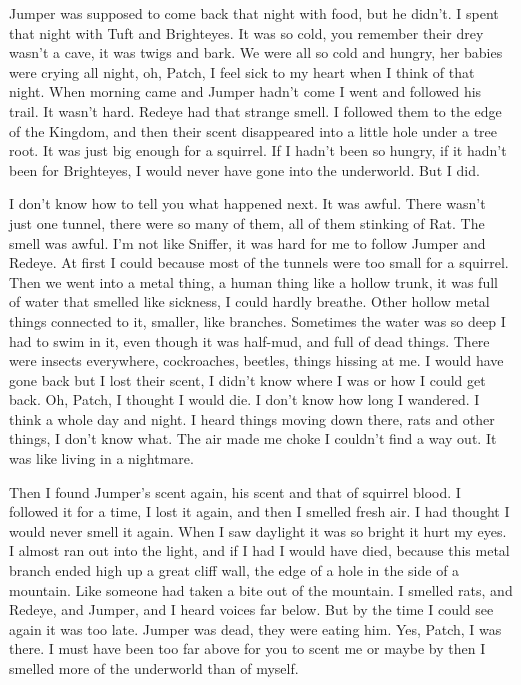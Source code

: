 \documentclass[11pt]{article}
\begin{document}
 Jumper was supposed to come back that night with food, but he didn't. I spent that night with Tuft and Brighteyes. It was so cold, you remember their drey wasn't a cave, it was twigs and bark. We were all so cold and hungry, her babies were crying all night, oh, Patch, I feel sick to my heart when I think of that night. When morning came and Jumper hadn't come I went and followed his trail. It wasn't hard. Redeye had that strange smell. I followed them to the edge of the Kingdom, and then their scent disappeared into a little hole under a tree root. It was just big enough for a squirrel. If I hadn't been so hungry, if it hadn't been for Brighteyes, I would never have gone into the underworld. But I did.\par
 I don't know how to tell you what happened next. It was awful. There wasn't just one tunnel, there were so many of them, all of them stinking of Rat. The smell was awful. I'm not like Sniffer, it was hard for me to follow Jumper and Redeye. At first I could because most of the tunnels were too small for a squirrel. Then we went into a metal thing, a human thing like a hollow trunk, it was full of water that smelled like sickness, I could hardly breathe. Other hollow metal things connected to it, smaller, like branches. Sometimes the water was so deep I had to swim in it, even though it was half-mud, and full of dead things. There were insects everywhere, cockroaches, beetles, things hissing at me. I would have gone back but I lost their scent, I didn't know where I was or how I could get back. Oh, Patch, I thought I would die. I don't know how long I wandered. I think a whole day and night. I heard things moving down there, rats and other things, I don't know what. The air made me choke I couldn't find a way out. It was like living in a nightmare.\par
 Then I found Jumper's scent again, his scent and that of squirrel blood. I followed it for a time, I lost it again, and then I smelled fresh air. I had thought I would never smell it again. When I saw daylight it was so bright it hurt my eyes. I almost ran out into the light, and if I had I would have died, because this metal branch ended high up a great cliff wall, the edge of a hole in the side of a mountain. Like someone had taken a bite out of the mountain. I smelled rats, and Redeye, and Jumper, and I heard voices far below. But by the time I could see again it was too late. Jumper was dead, they were eating him. Yes, Patch, I was there. I must have been too far above for you to scent me %
 or maybe by then I smelled more of the underworld than of myself.\par
\end{document}
